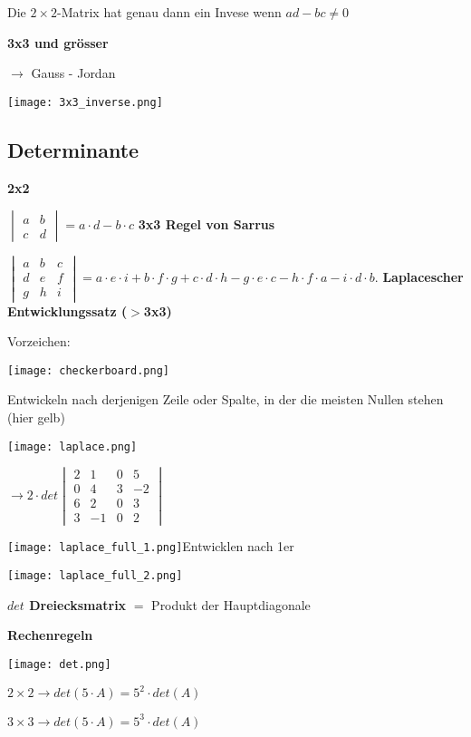 \begin{multicols*}{3}
{Die $2\times2$-Matrix hat genau dann ein Invese wenn $ad-bc \neq 0$}

\textbf{3x3 und grösser}

{$\rightarrow$ Gauss - Jordan}

 \texttt{[image: 3x3\_inverse.png]} 
\WhiteSpace

\subsection{Determinante}
{\textbf{2x2}}

$\begin{vmatrix}
a & b\\
c & d
\end{vmatrix} = a\cdot d - b\cdot c $
\WhiteSpace
\textbf{3x3 Regel von Sarrus}

$\begin{vmatrix} a & b & c \\ d & e & f \\ g & h &i \end{vmatrix} = a \cdot e \cdot i + b \cdot f \cdot g + c \cdot d \cdot h - g \cdot e \cdot c - h \cdot f \cdot a - i \cdot d \cdot b.$
\WhiteSpace
\textbf{Laplacescher Entwicklungssatz ($ >$3x3)}

{\begin{multicols}{2}
Vorzeichen:

\columnbreak
{ \texttt{[image: checkerboard.png]} }
 
\end{multicols}}

{{Entwickeln nach derjenigen Zeile oder Spalte, in
der die meisten Nullen stehen (hier gelb)}}
{\begin{multicols}{2}
 {\texttt{[image: laplace.png]}}
\columnbreak

{  $ \rightarrow  2 \cdot det \begin{vmatrix} 2 & 1 & 0 & 5 \\ 0 & 4 & 3 & -2 \\ 6 & 2 &0 & 3 \\ 3 & -1 &0 & 2 \end{vmatrix} $}
\end{multicols}}

{\texttt{[image: laplace\_full\_1.png]}Entwicklen nach 1er}  

{\texttt{[image: laplace\_full\_2.png]}}


\textbf{$det$ Dreiecksmatrix}
$ = $ Produkt der Hauptdiagonale
\WhiteSpace

\textbf{Rechenregeln}

{\texttt{[image: det.png]}}

$2\times 2 \rightarrow det(5 \cdot A) = 5^2 \cdot det(A)$

$3\times 3 \rightarrow det(5 \cdot A) = 5^3 \cdot det(A)$

 
\mbox{}
	
\end{multicols*} 


